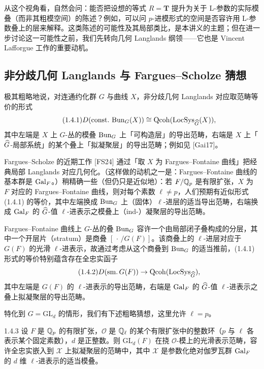 从这个视角看，自然会问：能否把设想的等式 $R=\mathbf T$ 提升为关于 L-参数的实际模叠（而非其粗模空间）的陈述？例如，可以问 $p$-进模形式的空间是否容许用 L-参数叠上的层来解释。这类陈述的可能性及其局部类比，是本讲义的主题；但在进一步讨论这一可能性之前，我们先转向几何 Langlands 纲领——它也是 Vincent Lafforgue 工作的重要动机。

\subsection{非分歧几何 Langlands 与 Fargues--Scholze 猜想}

极其粗略地说，对连通约化群 $G$ 与曲线 $X$，非分歧几何 Langlands 对应取范畴等价的形式
\begin{equation}\tag{1.4.1}\label{eq:a4-1-4-1}
D(\mathrm{const.}\,\operatorname{Bun}_G(X))\cong \operatorname{Qcoh}(\operatorname{LocSys}_{\widehat{G}}(X)),
\end{equation}
其中左端是 $X$ 上 $G$-丛的模叠 $\operatorname{Bun}_G$ 上「可构造层」的导出范畴，右端是 $X$ 上「$\widehat{G}$-局部系统」的某个叠上「拟凝聚层」的导出范畴；例如见 [Gai17]。

Fargues--Scholze 的近期工作 [FS24] 通过「取 $X$ 为 Fargues--Fontaine 曲线」把经典局部 Langlands 对应几何化。（这样做的动机之一是：Fargues--Fontaine 曲线的基本群是 $\operatorname{Gal}_F$。）稍精确一些（但仍只是近似地）：若 $F/\mathbb{Q}_p$ 是有限扩张，$X$ 为 $F$ 对应的 Fargues--Fontaine 曲线，则对每个素数 $\ell\neq p$，人们预期有近似形式 (1.4.1) 的等价，其中左端换成 $\operatorname{Bun}_G$ 上（固体）$\ell$-进层的适当导出范畴，右端换成 $\operatorname{Gal}_F$ 的 $\widehat{G}$-值 $\ell$-进表示之模叠上（ind-）凝聚层的导出范畴。

Fargues--Fontaine 曲线上 $G$-丛的叠 $\operatorname{Bun}_G$ 容许一个由局部闭子叠构成的分层，其中一个开层片（stratum）是商叠 $[\,\cdot\,/G(F)]$。该商叠上的 $\ell$-进层对应于 $G(F)$ 的光滑 $\ell$-进表示，故通过考虑从这个商叠到 $\operatorname{Bun}_G$ 的适当推前，(1.4.1) 形式的等价特别蕴含存在全忠实函子
\begin{equation}\tag{1.4.2}\label{eq:a4-1-4-2}
D(\mathrm{sm.}\,G(F))\to\operatorname{Qcoh}(\operatorname{LocSys}_{\widehat{G}}),
\end{equation}
其中左端是 $G(F)$ 的 $\ell$-进表示的导出范畴，右端是 $\operatorname{Gal}_F$ 的 $\widehat{G}$-值 $\ell$-进表示之叠上拟凝聚层的导出范畴。

特化到 $G=\mathrm{GL}_d$ 的情形，我们有下述粗略猜想，这里允许 $\ell=p$。

\begin{conj}{1.4.3}\label{conj:a4-1-4-3}
设 $F$ 是 $\mathbb{Q}_p$ 的有限扩张，$\mathcal O$ 是 $\mathbb{Q}_\ell$ 的某个有限扩张中的整数环（$p$ 与 $\ell$ 各表示某个固定素数），$d$ 是正整数。则 $\mathrm{GL}_d(F)$ 在挠 $\mathcal O$-模上的光滑表示范畴，容许全忠实嵌入到 $\mathcal X$ 上拟凝聚层的范畴中，其中 $\mathcal X$ 是参数化绝对伽罗瓦群 $\operatorname{Gal}_F$ 的 $d$ 维 $\ell$-进表示的适当模叠。
\end{conj}

